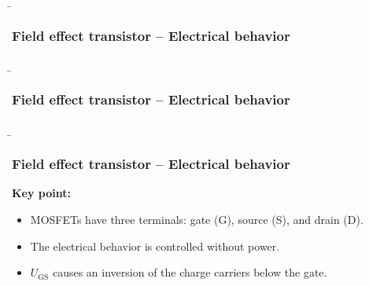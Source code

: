 \begin{frame}
    \b{ \frametitle{Field effect transistor -- Electrical behavior}
        \begin{figure}[H]
            \centering
            
        \end{figure}
    }
\end{frame}

\begin{frame}
    \b{ \frametitle{Field effect transistor -- Electrical behavior}
        \begin{figure}[H]
            \centering
            
        \end{figure}
    }
\end{frame}

\begin{frame}
    \b{\frametitle{Field effect transistor -- Electrical behavior}
        \textbf{Key point:}
        \begin{itemize}
            \item MOSFETs have three terminals: gate (G), source (S), and drain (D).
            \item The electrical behavior is controlled without power.
            \item $U_\mathrm{GS}$ causes an inversion of the charge carriers below the gate.
        \end{itemize}
        }
\end{frame}

